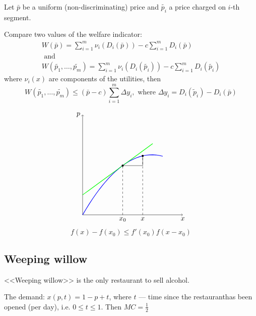 \documentclass[a4paper, 10pt]{article}
\begin{document}
\begin{minipage}{0.5\textwidth}
    \proposition Let $\bar{p}$ be a uniform (non-discriminating) price and $\tilde{p_i}$ a price charged on $i$-th segment.

Compare two values of the welfare indicator:
$$
\begin{gathered}
W(\bar{p})=\sum_{i=1}^m \nu_i\left(D_i(\bar{p})\right)-c \sum_{i=1}^m D_i(\bar{p}) \\
\text { and } \\
W\left(\tilde{p_1}, \ldots, \tilde{p_m}\right)=\sum_{i=1}^m \nu_i\left(D_i\left(\tilde{p_i}\right)\right)-c \sum_{i=1}^m D_i\left(\tilde{p_i}\right)
\end{gathered}
$$
where $\nu_i(x)$ are components of the utilities, then
$$
W\left(\tilde{p_1}, \ldots, \tilde{p_m}\right) \leqslant(\bar{p}-c) \sum_{i=1}^m \Delta y_i,\text{ where }\Delta y_i=D_i\left(\tilde{p}_i\right)-D_i(\bar{p})
$$
\end{minipage}
\begin{minipage}{0.5\textwidth}
    $$
\begin{tikzpicture}
    \draw[->] (0,0) -- (5,0) node[below] {$x$};
    \draw[->] (0,0) -- (0,5) node[left] {$p$};

    \draw[blue, thick, domain=0:4] plot (\x, {-(0.5*\x-1.7320508)^2+3}) node[right] {};

    \draw[green, thick, domain=0:3.5] plot (\x, {0.732*\x+0.996}) node[right] {};

    \draw[black, dashed] (2,0) node[below] {$x_0$} -- (2,2.46);
    \draw[black, dashed] (3,0) node[below] {$x$}  -- (3, 2.94615);
    \fill[teal, black] (2, 2.46) circle (1.5pt);
    \fill[teal, black] (3, 2.94615) circle (1.5pt);
    \draw[black] (2,2.46) -- (3,2.46);
    \draw[black] (3,2.46) -- (3, 2.94615);
\end{tikzpicture}
$$
$$f(x)-f(x_0)\leqslant f'(x_0)f(x-x_0)$$
\end{minipage}

\subsection{Weeping willow}
<<Weeping willow>> is the only restaurant to sell alcohol. 

The demand: $x(p,t)=1-p+t$, where $t$ — time since the restauranthas been opened (per day), i.e. $0\leqslant t\leqslant1$. Then $MC=\frac{1}{2}$
\end{document}
